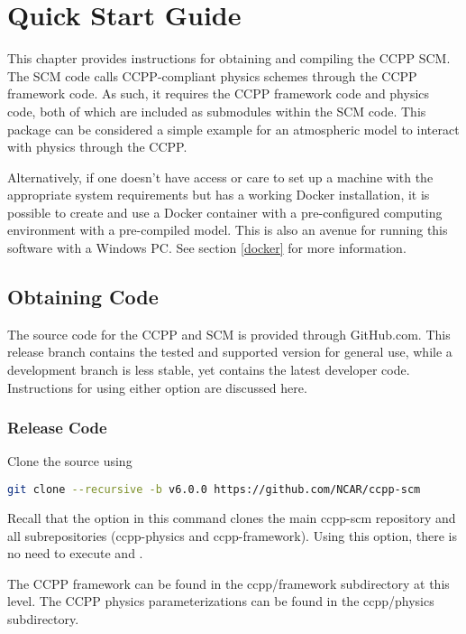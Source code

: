 \chapter{Quick Start Guide}
\label{chapter: quick}

This chapter provides instructions for obtaining and compiling the CCPP SCM. The SCM code calls CCPP-compliant physics schemes through the CCPP framework code. As such, it requires the CCPP framework code and physics code, both of which are included as submodules within the SCM code. This package can be considered a simple example for an atmospheric model to interact with physics through the CCPP.

Alternatively, if one doesn't have access or care to set up a machine with the appropriate system requirements but has a working Docker installation, it is possible to create and use a Docker container with a pre-configured computing environment with a pre-compiled model. This is also an avenue for running this software with a Windows PC. See section \ref{docker} for more information.

\section{Obtaining Code}
\label{obtaining_code}

The source code for the CCPP and SCM is provided through GitHub.com.  This release branch contains the tested and supported version for general use, while a development branch is less stable, yet contains the latest developer code. Instructions for using either option are discussed here.

\subsection{Release Code}

Clone the source using
\begin{lstlisting}[language=bash]
git clone --recursive -b v6.0.0 https://github.com/NCAR/ccpp-scm
\end{lstlisting}
             Recall that the  option in this command clones the main ccpp-scm repository and all subrepositories (ccpp-physics and ccpp-framework). Using this option, there is no need to execute  and .

The CCPP framework can be found in the ccpp/framework subdirectory at this level.  The CCPP physics parameterizations can be found in the ccpp/physics subdirectory.

